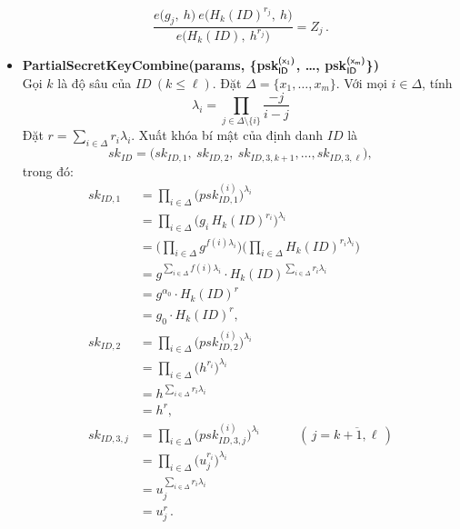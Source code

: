 \documentclass[class=report, crop=false]{standalone}
\begin{document}
\begin{itemize}[leftmargin=1cm, itemindent=-1cm]
\[				\frac{e \Big(g_j,\ h \Big)\ e \Big(H_{k}(ID)^{r_j},\ h \Big)}{e \Big(H_{k}(ID),\ h^{r_j} \Big)} = Z_j \,.
			\]
			\item[] {\sffamily\bfseries PartialSecretKeyCombine(params, \{psk$_{\textsf{ID}}^{\textsf{(x\textsubscript{1})}}$, \dots, psk$_{\textsf{ID}}^{\textsf{(x\textsubscript{m})}}$\})} \\
			Gọi $k$ là độ sâu của $ID \ (k \leq \ell)$. Đặt $\Delta = \{x_1, \dots, x_m \}$. Với mọi $i \in \Delta$, tính
			\[
				\lambda_i = \prod_{j \in \Delta \setminus \{i\}}\frac{-j}{i - j}
			\]
			Đặt $r = \sum_{i \in \Delta} r_i \lambda_i$. Xuất khóa bí mật của định danh $ID$ là
			\[
				sk_{ID} = \Big(sk_{ID, 1},\ sk_{ID, 2},\ sk_{ID, 3, k + 1}, \dots, sk_{ID, 3, \ell} \Big),
			\]
			trong đó:
			\begin{align*}
				sk_{ID, 1} &=
				\prod_{i \in \Delta} \Big(psk_{ID, 1}^{(i)} \Big)^{\lambda_i} \\ &=
				\prod_{i \in \Delta} \Big(g_i\, H_{k}(ID)^{r_i} \Big)^{\lambda_i} \\ &=
				\Big(\prod_{i \in \Delta} g^{f(i) \lambda_i} \Big) \Big(\prod_{i \in \Delta} H_{k}(ID)^{r_i \lambda_i} \Big) \\ &=
				g^{\sum_{i \in \Delta} f(i) \lambda_i} \cdot H_{k}(ID)^{\sum_{i \in \Delta} r_i \lambda_i}  \\ &=
				g^{\alpha_0} \cdot H_{k}(ID)^r \\ &=
				g_0 \cdot H_{k}(ID)^r, \\
				sk_{ID, 2} &=
				\prod_{i \in \Delta} \Big(psk_{ID, 2}^{(i)} \Big)^{\lambda_i} \\ &=
				\prod_{i \in \Delta} \Big(h^{r_i} \Big)^{\lambda_i} \\ &=
				h^{\sum_{i \in \Delta} r_i \lambda_i} \\ &=
				h^r, \\
				sk_{ID, 3, j} &=
				\prod_{i \in \Delta} \Big(psk_{ID, 3, j}^{(i)} \Big)^{\lambda_i} \quad\quad\quad (\, j = \overline{k + 1, \ell}\,) \\ &=
				\prod_{i \in \Delta} \Big(u_j^{r_i} \Big)^{\lambda_i} \\ &=
				u_j^{\sum_{i \in \Delta} r_i \lambda_i} \\ &=
				u_j^r \,.
			\end{align*}


\end{itemize}
\end{document}
